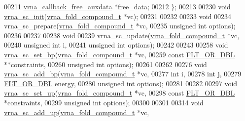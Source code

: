 \begin{DoxyCode}
00211   \hyperlink{group__fold__compound_ga7806651f51b195013839a218b3bbd5a3}{vrna\_callback\_free\_auxdata}  *free\_data;
00212 \};
00213 
00230 \textcolor{keywordtype}{void} \hyperlink{group__soft__constraints_ga9d977a1681356778cc66dceafbe5b032}{vrna\_sc\_init}(\hyperlink{group__fold__compound_structvrna__fc__s}{vrna\_fold\_compound\_t} *vc);
00231 
00232 
00233 \textcolor{keywordtype}{void}
00234 vrna\_sc\_prepare(\hyperlink{group__fold__compound_structvrna__fc__s}{vrna\_fold\_compound\_t}  *vc,
00235                 \textcolor{keywordtype}{unsigned} \textcolor{keywordtype}{int}          options);
00236 
00237 
00238 \textcolor{keywordtype}{void}
00239 vrna\_sc\_update(\hyperlink{group__fold__compound_structvrna__fc__s}{vrna\_fold\_compound\_t} *vc,
00240                \textcolor{keywordtype}{unsigned} \textcolor{keywordtype}{int}         i,
00241                \textcolor{keywordtype}{unsigned} \textcolor{keywordtype}{int}         options);
00242 
00243 
00258 \textcolor{keywordtype}{void} \hyperlink{group__soft__constraints_ga8e4334b24bc91453fbcda490a4e331af}{vrna\_sc\_set\_bp}(\hyperlink{group__fold__compound_structvrna__fc__s}{vrna\_fold\_compound\_t}  *vc,
00259                     \textcolor{keyword}{const} \hyperlink{group__data__structures_ga31125aeace516926bf7f251f759b6126}{FLT\_OR\_DBL}      **constraints,
00260                     \textcolor{keywordtype}{unsigned} \textcolor{keywordtype}{int}          options);
00261 
00262 
00276 \textcolor{keywordtype}{void} \hyperlink{group__soft__constraints_gaf162aedac7422f2eb16ea030f47d2f4b}{vrna\_sc\_add\_bp}(\hyperlink{group__fold__compound_structvrna__fc__s}{vrna\_fold\_compound\_t}  *vc,
00277                     \textcolor{keywordtype}{int}                   i,
00278                     \textcolor{keywordtype}{int}                   j,
00279                     \hyperlink{group__data__structures_ga31125aeace516926bf7f251f759b6126}{FLT\_OR\_DBL}            energy,
00280                     \textcolor{keywordtype}{unsigned} \textcolor{keywordtype}{int}          options);
00281 
00282 
00297 \textcolor{keywordtype}{void} \hyperlink{group__soft__constraints_ga99ed63f3ef9e7fe3997932030487a344}{vrna\_sc\_set\_up}(\hyperlink{group__fold__compound_structvrna__fc__s}{vrna\_fold\_compound\_t}  *vc,
00298                     \textcolor{keyword}{const} \hyperlink{group__data__structures_ga31125aeace516926bf7f251f759b6126}{FLT\_OR\_DBL}      *constraints,
00299                     \textcolor{keywordtype}{unsigned} \textcolor{keywordtype}{int}          options);
00300 
00301 
00314 \textcolor{keywordtype}{void} \hyperlink{group__soft__constraints_ga069915fe203a2c8e522dd37847177a09}{vrna\_sc\_add\_up}(\hyperlink{group__fold__compound_structvrna__fc__s}{vrna\_fold\_compound\_t}  *vc,

\end{DoxyCode}
